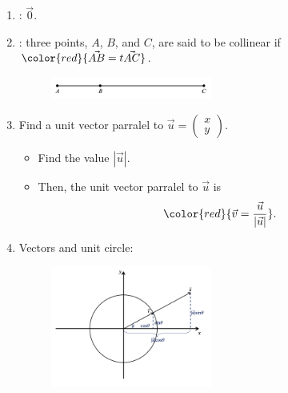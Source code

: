 \documentclass[12pt, a4paper]{article}
\begin{document}
\begin{enumerate}
  $${\color{red}{\vec{a}-\vec{b}=\begin{pmatrix}x-m\\y-n\end{pmatrix}}}.$$
  \begin{proof}{3.2.1.1}{}
    $$\begin{aligned}
      -\vec{b}&=(-1)\vec{b}=\begin{pmatrix}-m\\-n\end{pmatrix}\\
      \vec{a}-\vec{b}&=\vec{a}+\left(-\vec{b}\right)=\begin{pmatrix}x-m\\y-n\end{pmatrix}.
    \end{aligned}$$
  \end{proof}
  \item \textbf{\color{red}{Zero vector}}: $\vec{0}$.
  \item \textbf{\color{red}{Collinear points}}: three points, $A$, $B$, and $C$, are said to be collinear if ${\color{red}{\vec{AB}=t\vec{AC}}}$.
  \begin{figure}[H]
    \centering
    \includegraphics[width=0.5\textwidth]{Fig.3.5.jpg}
  \end{figure}
  \item Find a unit vector parralel to $\vec{u}=\begin{pmatrix}x\\y\end{pmatrix}.$
  \begin{itemize}
    \item Find the value $\left|\vec{u}\right|.$
    \item Then, the unit vector parralel to $\vec{u}$ is 
    $${\color{red}{\vec{v}=\frac{\vec{u}}{\left|\vec{u}\right|}}}.$$
  \end{itemize}
  \item Vectors and unit circle: 
  \begin{figure}[H]
    \centering
    \includegraphics[width=0.5\textwidth]{Fig.3.6.jpg}

\end{figure}
\end{enumerate}
\end{document}

